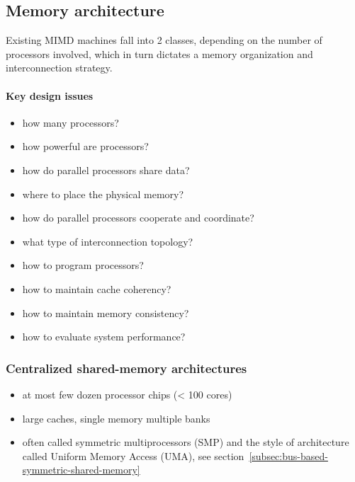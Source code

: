 \subsection{Memory architecture}\label{subsec:memory-architecture}
Existing MIMD machines fall into 2 classes, depending on the number
of processors involved, which in turn dictates a memory organization
and interconnection strategy.

\paragraph{Key design issues}
\begin{itemize}
    \item how many processors?
    \item how powerful are processors?
    \item how do parallel processors share data?
    \item where to place the physical memory?
    \item how do parallel processors cooperate and coordinate?
    \item what type of interconnection topology?
    \item how to program processors?
    \item how to maintain cache coherency?
    \item how to maintain memory consistency?
    \item how to evaluate system performance?
\end{itemize}

\subsubsection{Centralized shared-memory architectures}\label{subsubsec:centralized-shared-memory-architectures}
\begin{itemize}
    \item at most few dozen processor chips (< 100 cores)
    \item large caches, single memory multiple banks
    \item often called symmetric multiprocessors (SMP) and the
    style of architecture called Uniform Memory Access (UMA), see section~\ref{subsec:bus-based-symmetric-shared-memory}
\end{itemize}

